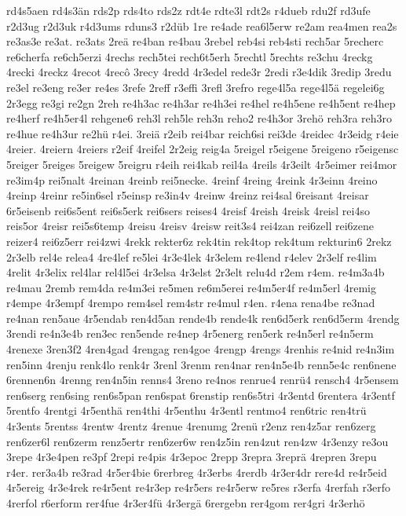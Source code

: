 {rd4s5aen
rd4s3än
rds2p
rds4to
rds2z
rdt4e
rdte3l
rdt2s
r4dueb
rdu2f
rd3ufe
r2d3ug
r2d3uk
r4d3ums
rduns3
r2düb
1re
re4ade
rea6l5erw
re2am
rea4men
rea2s
re3as3e
re3at.
re3ats
2reä
re4ban
re4bau
3rebel
reb4si
reb4sti
rech5ar
5recherc
re6cherfa
re6ch5erzi
4rechs
rech5tei
rech6t5erh
5rechtl
5rechts
re3chu
4reckg
4recki
4reckz
4recot
4recô
3recy
4redd
4r3edel
rede3r
2redi
r3e4dik
3redip
3redu
re3el
re3eng
re3er
re4es
3refe
2reff
r3effi
3refl
3refro
rege4l5a
rege4l5ä
regelei6g
2r3egg
re3gi
re2gn
2reh
re4h3ac
re4h3ar
re4h3ei
re4hel
re4h5ene
re4h5ent
re4hep
re4herf
re4h5er4l
rehgene6
reh3l
reh5le
reh3n
reho2
re4h3or
3rehö
reh3ra
reh3ro
re4hue
re4h3ur
re2hü
r4ei.
3reiä
r2eib
rei4bar
reich6si
rei3de
4reidec
4r3eidg
r4eie
4reier.
4reiern
4reiers
r2eif
4reifel
2r2eig
reig4a
5reigel
r5eigene
5reigeno
r5eigensc
5reiger
5reiges
5reigew
5reigru
r4eih
rei4kab
reil4a
4reils
4r3eilt
4r5eimer
rei4mor
re3im4p
rei5nalt
4reinan
4reinb
rei5necke.
4reinf
4reing
4reink
4r3einn
4reino
4reinp
4reinr
re5in6sel
r5einsp
re3in4v
4reinw
4reinz
rei4sal
6reisant
4reisar
6r5eisenb
rei6s5ent
rei6s5erk
rei6sers
reises4
4reisf
4reish
4reisk
4reisl
rei4so
reis5or
4reisr
rei5s6temp
4reisu
4reisv
4reisw
reit3s4
rei4zan
rei6zell
rei6zene
reizer4
rei6z5err
rei4zwi
4rekk
rekter6z
rek4tin
rek4top
rek4tum
rekturin6
2rekz
2r3elb
rel4e
relea4
4re4lef
re5lei
4r3e4lek
4r3elem
re4lend
r4elev
2r3elf
re4lim
4relit
4r3elix
rel4lar
rel4l5ei
4r3elsa
4r3elst
2r3elt
relu4d
r2em
r4em.
re4m3a4b
re4mau
2remb
rem4da
re4m3ei
re5men
re6m5erei
re4m5er4f
re4m5erl
4remig
r4empe
4r3empf
4rempo
rem4sel
rem4str
re4mul
r4en.
r4ena
rena4be
re3nad
re4nan
ren5aue
4r5endab
ren4d5an
rende4b
rende4k
ren6d5erk
ren6d5erm
4rendg
3rendi
re4n3e4b
ren3ec
ren5ende
re4nep
4r5energ
ren5erk
re4n5erl
re4n5erm
4renexe
3ren3f2
4ren4gad
4rengag
ren4goe
4rengp
4rengs
4renhis
re4nid
re4n3im
ren5inn
4renju
renk4lo
renk4r
3renl
3renm
ren4nar
ren4n5e4b
renn5e4c
ren6nene
6rennen6n
4renng
ren4n5in
renns4
3reno
re4nos
renrue4
renrü4
rensch4
4r5ensem
ren6serg
ren6sing
ren6s5pan
ren6spat
6renstip
ren6s5tri
4r3entd
6rentera
4r3entf
5rentfo
4rentgi
4r5enthä
ren4thi
4r5enthu
4r3entl
rentmo4
ren6tric
ren4trü
4r3ents
5rentss
4rentw
4rentz
4renue
4renumg
2renü
r2enz
ren4z5ar
ren6zerg
ren6zer6l
ren6zerm
renz5ertr
ren6zer6w
ren4z5in
ren4zut
ren4zw
4r3enzy
re3ou
3repe
4r3e4pen
re3pf
2repi
re4pis
4r3epoc
2repp
3repra
3reprä
4repren
3repu
r4er.
rer3a4b
re3rad
4r5er4bie
6rerbreg
4r3erbs
4rerdb
4r3er4dr
rere4d
re4r5eid
4r5ereig
4r3e4rek
re4r5ent
re4r3ep
re4r5ers
re4r5erw
re5res
r3erfa
4rerfah
r3erfo
4rerfol
r6erform
rer4fue
4r3er4fü
4r3ergä
6rergebn
rer4gom
rer4gri
4r3erhö
}
